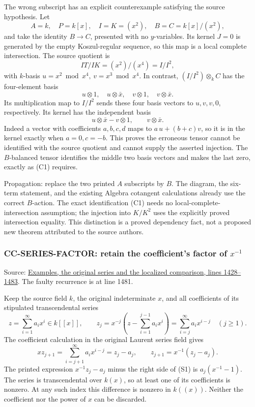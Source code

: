 \documentclass[11pt]{article}
\begin{document}
The wrong subscript has an explicit counterexample satisfying the source hypothesis. Let \[
 A=k,\quad P=k[x],\quad I=K=(x^2),\quad
 B=C=k[x]/(x^2),
\] and take the identity \(B\to C\), presented with no \(y\)-variables. Its kernel \(J=0\) is generated by the empty Koszul-regular sequence, so this map is a local complete intersection. The source quotient is \[
 IT/IK=(x^2)/(x^4)=I/I^2,
\] with \(k\)-basis \(u=x^2\bmod x^4,\ v=x^3\bmod x^4\). In contrast, \((I/I^2)\otimes_k C\) has the four-element basis \[
 u\otimes1,\quad u\otimes\bar x,\quad v\otimes1,\quad
 v\otimes\bar x.
\] Its multiplication map to \(I/I^2\) sends these four basis vectors to \(u,v,v,0\), respectively. Its kernel has the independent basis \[
 u\otimes\bar x-v\otimes1,\qquad v\otimes\bar x.
\] Indeed a vector with coefficients \(a,b,c,d\) maps to \(a\,u+(b+c)v\), so it is in the kernel exactly when \(a=0,c=-b\). This proves the erroneous tensor cannot be identified with the source quotient and cannot supply the asserted injection. The \(B\)-balanced tensor identifies the middle two basis vectors and makes the last zero, exactly as (C1) requires.

Propagation: replace the two printed \(A\) subscripts by \(B\). The diagram, the six-term statement, and the existing Algebra cotangent calculations already use the correct \(B\)-action. The exact identification (C1) needs no local-complete-intersection assumption; the injection into \(K/K^2\) uses the explicitly proved intersection equality. This distinction is a proved dependency fact, not a proposed new theorem attributed to the source authors.

\subsubsection{\texorpdfstring{CC-SERIES-FACTOR: retain the coefficient's factor of \(x^{-1}\)}{CC-SERIES-FACTOR: retain the coefficient's factor of x\^{}\{-1\}}}\label{cc-series-factor-retain-the-coefficients-factor-of-x-1}

Source: \href{https://github.com/stacks/stacks-project/blob/a04446e57ec1fbc252a871afcec7752fb2807b14/examples.tex\#L1428}{Examples, the original series and the localized comparison, lines 1428--1483}. The faulty recurrence is at line 1481.

Keep the source field \(k\), the original indeterminate \(x\), and all coefficients of its stipulated transcendental series \[
 z=\sum_{i=1}^{\infty}a_i x^i\in k[[x]],\qquad
 z_j=x^{-j}\left(z-\sum_{i=1}^{j-1}a_i x^i\right)
     =\sum_{i=j}^{\infty}a_i x^{i-j}\quad(j\geq1).
\] The coefficient calculation in the original Laurent series field gives \[
 xz_{j+1}
 =\sum_{i=j+1}^{\infty}a_i x^{i-j}
 =z_j-a_j,\qquad
 z_{j+1}=x^{-1}(z_j-a_j).
\tag{S1}
\] The printed expression \(x^{-1}z_j-a_j\) minus the right side of (S1) is \(a_j(x^{-1}-1)\). The series is transcendental over \(k(x)\), so at least one of its coefficients is nonzero. At any such index this difference is nonzero in \(k((x))\). Neither the coefficient nor the power of \(x\) can be discarded.
\end{document}
